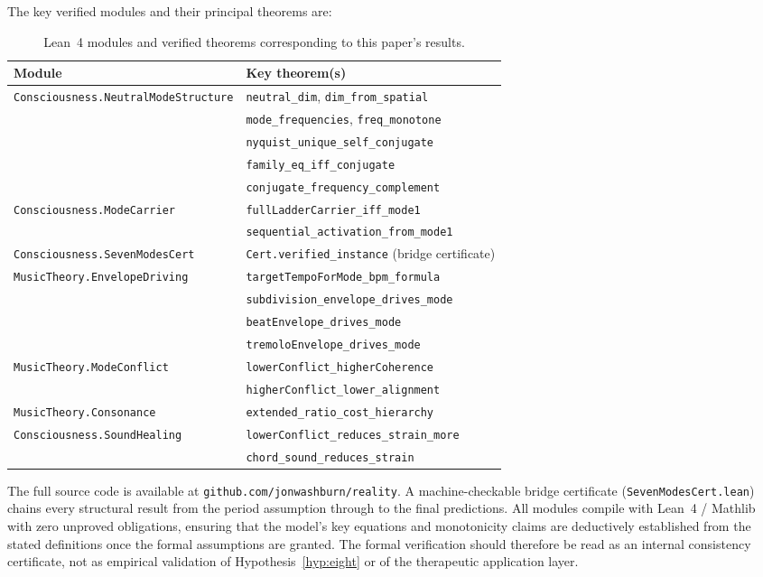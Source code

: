 \documentclass[11pt,a4paper]{article}
\begin{document}
The key verified modules and their principal theorems are:

\begin{table}[H]
\centering
\small
\caption{Lean~4 modules and verified theorems corresponding to this paper's results.}
\label{tab:lean}
\begin{tabular}{@{}ll@{}}
\toprule
Module & Key theorem(s) \\
\midrule
\texttt{Consciousness.NeutralModeStructure}
  & \texttt{neutral\_dim}, \texttt{dim\_from\_spatial} \\
  & \texttt{mode\_frequencies}, \texttt{freq\_monotone} \\
  & \texttt{nyquist\_unique\_self\_conjugate} \\
  & \texttt{family\_eq\_iff\_conjugate} \\
  & \texttt{conjugate\_frequency\_complement} \\
\texttt{Consciousness.ModeCarrier}
  & \texttt{fullLadderCarrier\_iff\_mode1} \\
  & \texttt{sequential\_activation\_from\_mode1} \\
\texttt{Consciousness.SevenModesCert}
  & \texttt{Cert.verified\_instance} (bridge certificate) \\
\texttt{MusicTheory.EnvelopeDriving}
  & \texttt{targetTempoForMode\_bpm\_formula} \\
  & \texttt{subdivision\_envelope\_drives\_mode} \\
  & \texttt{beatEnvelope\_drives\_mode} \\
  & \texttt{tremoloEnvelope\_drives\_mode} \\
\texttt{MusicTheory.ModeConflict}
  & \texttt{lowerConflict\_higherCoherence} \\
  & \texttt{higherConflict\_lower\_alignment} \\
\texttt{MusicTheory.Consonance}
  & \texttt{extended\_ratio\_cost\_hierarchy} \\
\texttt{Consciousness.SoundHealing}
  & \texttt{lowerConflict\_reduces\_strain\_more} \\
  & \texttt{chord\_sound\_reduces\_strain} \\
\bottomrule
\end{tabular}
\end{table}

\noindent The full source code is available at
\texttt{github.com/jonwashburn/reality}.
A machine-checkable bridge certificate
(\texttt{SevenModesCert.lean}) chains every structural result from
the period assumption through to the final predictions.
All modules compile with Lean~4 / Mathlib with zero unproved
obligations, ensuring that the model's key equations
and monotonicity claims are deductively established from the stated
definitions once the formal assumptions are granted. The formal
verification should therefore be read as an internal consistency
certificate, not as empirical validation of
Hypothesis~\ref{hyp:eight} or of the therapeutic application layer.
\end{document}
